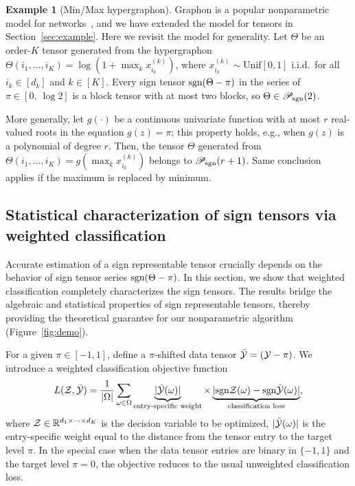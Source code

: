 \documentclass{article}
\theoremstyle{plain}
\theoremstyle{definition}
\newtheorem{example}{Example}
\newcommand*{\KeepStyleUnderBrace}[1]{%
  \mathop{%
    \mathchoice
    {\underbrace{\displaystyle#1}}%
    {\underbrace{\textstyle#1}}%
    {\underbrace{\scriptstyle#1}}%
    {\underbrace{\scriptscriptstyle#1}}%
  }\limits
}
\def\sign{\textup{sgn}}
\def\caliP{\mathscr{P}_{\textup{sgn}}}
\begin{document}
\begin{example}[Min/Max hypergraphon] Graphon is a popular nonparametric model for networks~\cite{chan2014consistent,xu2018rates}, and we have extended the model for tensors in Section~\ref{sec:example}. Here we revisit the model for generality. Let $\Theta$ be an order-$K$ tensor generated from the hypergraphon $\Theta(i_1,\ldots,i_K)=\log(1+\max_kx^{(k)}_{i_k})$, where $x^{(k)}_{i_k}\sim \text{Unif}[0,1]$ i.i.d.\ for all $i_k\in[d_k]$ and $k\in[K]$. Every sign tensor $\sign(\Theta-\pi)$ in the series of $\pi\in[0,\ \log 2]$ is a block tensor with at most two blocks, so $\Theta \in \caliP(2)$. 

More generally, let $g(\cdot)$ be a continuous univariate function with at most $r$ real-valued roots in the equation $g(z)=\pi$; this property holds, e.g., when $g(z)$ is a polynomial of degree $r$. Then, the tensor $\Theta$ generated from $\Theta(i_1,\ldots,i_K)=g(\max_kx^{(k)}_{i_k})$ belongs to $\caliP(r+1)$. Same conclusion applies if the maximum is replaced by minimum.
\end{example}

\subsection{Statistical characterization of sign tensors via weighted classification}

Accurate estimation of a sign representable tensor crucially depends on the behavior of sign tensor series $\sign(\Theta-\pi)$. In this section, we show that weighted classification completely characterizes the sign tensors. The results bridge the algebraic and statistical properties of sign representable tensors, thereby providing the theoretical guarantee for our nonparametric algorithm (Figure~\ref{fig:demo}).
 
 For a given $\pi \in [-1,1]$, define a $\pi$-shifted data tensor $\bar {\mathcal{Y}} = (\mathcal{Y}-\pi)$. We introduce a weighted classification objective function
\begin{equation}
L(\tZ, \bar \tY)= {1\over |\Omega|}\sum_{\omega \in \Omega}\KeepStyleUnderBrace{|\bar \tY(\omega)|}_{\text{entry-specific weight}} \times \KeepStyleUnderBrace{| \sign \tZ(\omega)-\sign \bar \tY(\omega)|}_{\text{classification loss}},
\end{equation}
where $\mathcal{Z}\in\mathbb{R}^{d_1\times \cdots \times d_K}$ is the decision variable to be optimized, $|\bar {\mathcal{Y}}(\omega)|$ is the entry-specific weight equal to the distance from the tensor entry to the target level $\pi$. In the special case when the data tensor entries are binary in $\{-1,1\}$ and the target level $\pi=0$, the objective reduces to the usual unweighted classification loss.
\end{document}
